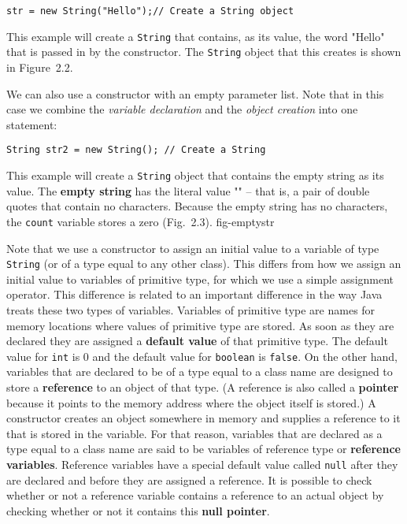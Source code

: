 \begin{jjjlisting}
\begin{lstlisting}
str = new String("Hello");// Create a String object
\end{lstlisting}
\end{jjjlisting}

\noindent This example will create a {\tt String} that
contains, as its value, the word "Hello" that is passed in by the
constructor.  The {\tt String} object that this creates is shown in
Figure~2.2.


We can also use a constructor with an empty parameter list.
Note that in this case we combine the {\it variable declaration}
and the {\it object creation} into one statement:

\begin{jjjlisting}
\begin{lstlisting}
String str2 = new String(); // Create a String
\end{lstlisting}
\end{jjjlisting}

\noindent This example will create a {\tt String} object
that contains the empty string as its value.  The {\bf empty string}
has the literal value "" -- that is, a pair of double quotes that
contain no characters. Because the empty string has no characters,
the {\tt count} variable stores a zero (Fig.~2.3).
{fig-emptystr}


Note that we use a constructor to assign an initial value to a
variable of type {\tt String} (or of a type equal to any other
class). This differs from how we assign an initial value to variables
of primitive type, for which we use a simple assignment operator.
This difference is related to an important difference in the way Java
treats these two types of variables.  Variables of primitive type are
names for memory locations where values of primitive type are stored.
As soon as they are declared they are assigned a {\bf default value}
of that primitive type.  The default value for {\tt int} is $0$ and
the default value for {\tt boolean} is {\tt false}.  On the other
hand, variables that are declared to be of a type equal to a class
name are designed to store a {\bf reference} to an object of that
type. (A reference is also called a {\bf pointer} because it points to
the memory address where the object itself is stored.) A constructor
creates an object somewhere in memory and supplies a reference to it
that is stored in the variable.  For that reason, variables that are
declared as a type equal to a class name are said to be variables of
reference type or {\bf reference variables}.  Reference variables have
a special default value called {\tt null} after they are declared and
before they are assigned a reference.  It is possible to check whether
or not a reference variable contains a reference to an actual object
by checking whether or not it contains this {\bf null pointer}.

